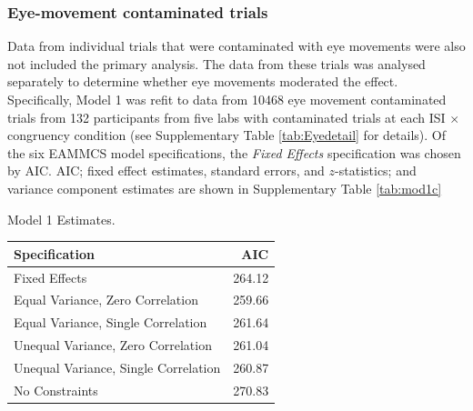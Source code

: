 \documentclass[A4paper,man,floatsintext]{apa6}
\theoremstyle{definition}
\theoremstyle{definition}
\theoremstyle{definition}
\theoremstyle{remark}
\begin{document}
\begin{appendix}
\subsubsection{Eye-movement contaminated
trials}\label{eye-movement-contaminated-trials}

Data from individual trials that were contaminated with eye movements
were also not included the primary analysis. The data from these trials
was analysed separately to determine whether eye movements moderated the
effect. Specifically, Model 1 was refit to data from 10468 eye movement
contaminated trials from 132 participants from five labs with
contaminated trials at each ISI \(\times\) congruency condition (see
Supplementary Table \ref{tab:Eyedetail} for details). Of the six EAMMCS
model specifications, the \emph{Fixed Effects} specification was chosen
by AIC. AIC; fixed effect estimates, standard errors, and
\(z\)-statistics; and variance component estimates are shown in
Supplementary Table \ref{tab:mod1c}

\begin{table}[!p]
\caption{\label{tab:mod1}Model 1 Estimates.}
\begin{subtable}{\textwidth}
\centering
\begin{table}[H]\centering\begingroup\fontsize{10}{12}\selectfont

\begin{tabular}{lr}
\toprule
Specification & AIC\\
\midrule
Fixed Effects & 264.12\\
Equal Variance, Zero Correlation & 259.66\\
Equal Variance, Single Correlation & 261.64\\
Unequal Variance, Zero Correlation & 261.04\\
Unequal Variance, Single Correlation & 260.87\\
No Constraints & 270.83\\
\bottomrule
\end{tabular}\endgroup{}
\end{table}
\end{subtable}
\begin{subtable}{\textwidth}
\caption{Fixed Effect Estimates}
\centering
\begin{table}[H]\centering\begingroup\fontsize{10}{12}\selectfont


\end{table}
\end{subtable}
\end{table}
\end{appendix}
\end{document}
